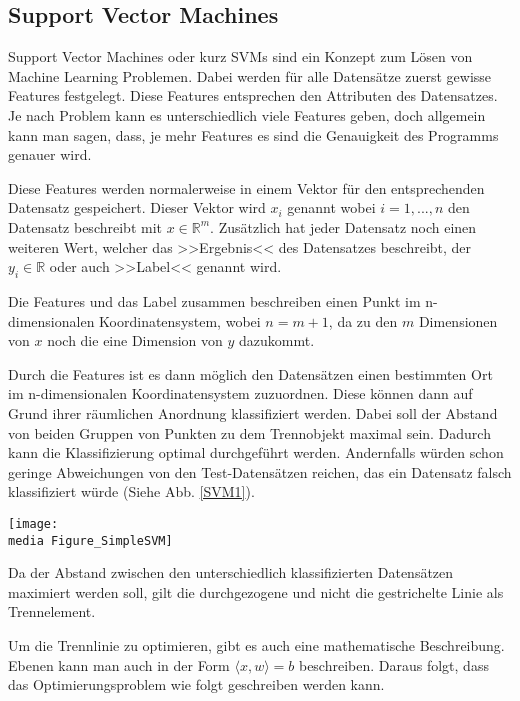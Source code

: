 \subsection{Support Vector Machines}
\author{David Steinmann}
Support Vector Machines oder kurz SVMs sind ein Konzept zum Lösen von Machine Learning Problemen.
Dabei werden für alle Datensätze zuerst gewisse Features festgelegt. Diese Features entsprechen den Attributen des Datensatzes. Je nach Problem kann es unterschiedlich viele Features geben, doch allgemein kann man sagen, dass, je mehr Features es sind die Genauigkeit des Programms genauer wird.

Diese Features werden normalerweise in einem Vektor für den entsprechenden Datensatz gespeichert.
Dieser Vektor wird $x_{i}$ genannt wobei $i = 1, ..., n$ den Datensatz beschreibt mit  $x \in  \mathbb{R}^m$.
Zusätzlich hat jeder Datensatz noch einen weiteren Wert, welcher das >>Ergebnis<< des Datensatzes beschreibt, der $y_{i} \in \mathbb{R}$ oder auch >>Label<< genannt wird.

Die Features und das Label zusammen beschreiben einen Punkt im n-dimensionalen Koordinatensystem, wobei $n = m + 1$, da zu den $m$ Dimensionen von $x$ noch die eine Dimension von $y$ dazukommt.

Durch die Features ist es dann möglich den Datensätzen einen bestimmten Ort im n-dimensionalen Koordinatensystem zuzuordnen. Diese können dann auf Grund ihrer räumlichen Anordnung klassifiziert werden. Dabei soll der Abstand von beiden Gruppen von Punkten zu dem Trennobjekt maximal sein. Dadurch kann die Klassifizierung optimal durchgeführt werden. Andernfalls würden schon geringe Abweichungen von den Test-Datensätzen reichen, das ein Datensatz falsch klassifiziert würde (Siehe Abb. \ref{SVM1}). 


\begin{dsafigure}
\begin{center}
	\label{SVM1}
	\texttt{[image: \\media Figure\_SimpleSVM]}
	\caption{Da der Abstand zwischen den unterschiedlich klassifizierten Datensätzen maximiert werden soll, gilt die durchgezogene und nicht die gestrichelte Linie als Trennelement.}
	\end{center}
\end{dsafigure}


Um die Trennlinie zu optimieren, gibt es auch eine mathematische Beschreibung. Ebenen kann man auch in der Form $\langle x, w \rangle = b $ beschreiben. Daraus folgt, dass das Optimierungsproblem wie folgt geschreiben werden kann.


